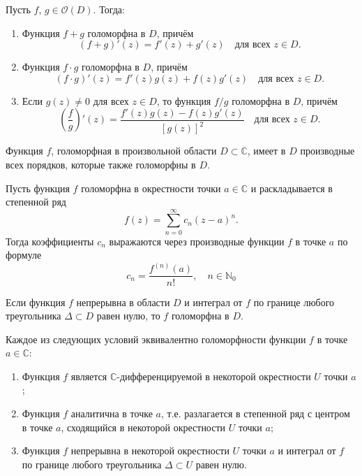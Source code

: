 \begin{theorem}
Пусть $f$, $g\in\mathcal{O}(D)$. Тогда:

\begin{enumerate}
  \item Функция $f + g$ голоморфна в $D$, причём
  \[
  (f + g)'(z) = f'(z) + g'(z) \quad \text{для всех } z \in D.
  \]

  \item Функция $f \cdot g$ голоморфна в $D$, причём
  \[
  (f \cdot g)'(z) = f'(z) g(z) + f(z) g'(z) \quad \text{для всех } z \in D.
  \]

  \item Если $g(z) \neq 0$ для всех $z \in D$, то функция $f / g$ голоморфна в $D$, причём
  \[
  \left( \frac{f}{g} \right)'(z) = \frac{f'(z) g(z) - f(z) g'(z)}{[g(z)]^2} \quad \text{для всех } z \in D.
  \]
\end{enumerate}
\end{theorem}

\begin{theorem}
Функция $f$, голоморфная в произвольной области $D \subset \mathbb{C}$, имеет в $D$ производные всех порядков, которые также голоморфны в $D$.
\end{theorem}

\begin{lemma}
Пусть функция $f$ голоморфна в окрестности точки $a \in \mathbb{C}$ и раскладывается в степенной ряд
\[
f(z) = \sum_{n=0}^{\infty} c_n (z - a)^n.
\]
Тогда коэффициенты $c_n$ выражаются через производные функции $f$ в точке $a$ по формуле
\[
c_n = \frac{f^{(n)}(a)}{n!}, \quad n \in\mathbb{N}_0
\]
\end{lemma}

\begin{theorem}[Морера]
Если функция $f$ непрерывна в области $D$ и интеграл от $f$ по границе любого треугольника $\Delta \subset D$ равен нулю, то $f$ голоморфна в $D$.
\end{theorem}

\begin{theorem}
Каждое из следующих условий эквивалентно голоморфности функции $f$ в точке $a \in \mathbb{C}$:

\begin{enumerate}
    \item Функция $f$ является $\mathbb{C}$-дифференцируемой в некоторой окрестности $U$ точки $a$;
    \item Функция $f$ аналитична в точке $a$, т.е. разлагается в степенной ряд с центром в точке $a$, сходящийся в некоторой окрестности $U$ точки $a$;
    \item Функция $f$ непрерывна в некоторой окрестности $U$ точки $a$ и интеграл от $f$ по границе любого треугольника $\Delta \subset U$ равен нулю.
\end{enumerate}
\end{theorem}

